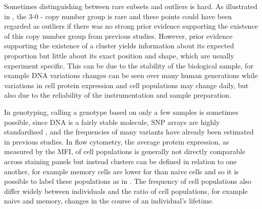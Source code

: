 


Sometimes distinguishing between rare subsets and outliers is hard.
As illustrated in , the 3-0 - copy number group is rare and these points could have been regarded as outliers if there was no strong prior evidence supporting the existence of this copy number group from previous studies.
However, prior evidence supporting the existence of a cluster yields information about its expected proportion but little about its exact position and shape, which are usually experiment specific.
This can be due to the stability of the biological sample,  for example DNA variations changes can be seen over many human generations while variations in cell protein expression and cell populations may change daily, but also due to the reliability of the instrumentation and sample preparation.

In genotyping, calling a genotype based on only a few samples is sometimes possible, since DNA is a fairly stable molecule, SNP arrays are highly standardised \citep{Di:2005uj,Giannoulatou:2008ty}, and the frequencies of many variants have already been estimated in previous studies.
In flow cytometry, the average protein expression, as measured by the \gls{MFI}, of cell populations is generally not directly comparable across staining panels but instead clusters can be defined in relation to one another, for example memory cells are lower for  than naive cells and so it is possible to label these populations as in .
The frequency of cell populations also differ widely between individuals and the ratio of cell populations, for example naive and memory, changes in the course of an individual's lifetime.



